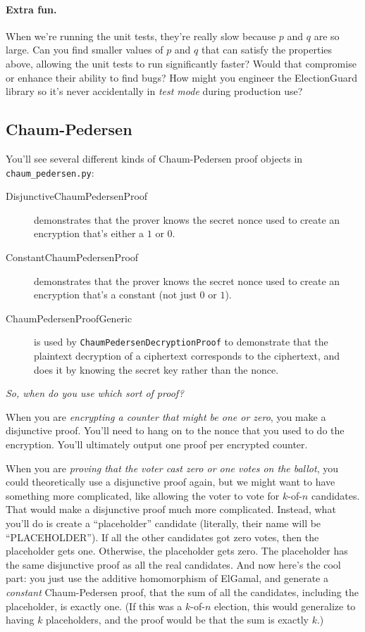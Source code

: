 \documentclass[letterpaper,12pt]{article}
\begin{document}
\paragraph{Extra fun.} When we're running the unit tests, they're
really slow because $p$ and $q$ are so large. Can you find smaller
values of $p$ and $q$ that can satisfy the properties above, allowing
the unit tests to run significantly faster? Would that compromise or
enhance their ability to find bugs? How might you engineer the
ElectionGuard library so it's never accidentally in {\em test mode}
during production use?

\subsection{Chaum-Pedersen}
\label{sec:chaum-pedersen}
You'll see several different kinds of Chaum-Pedersen proof objects
in {\tt chaum\_pedersen.py}:
\begin{description}
\item[DisjunctiveChaumPedersenProof] demonstrates that the prover knows
  the secret nonce used to create an encryption that's either a $1$ or $0$.
\item[ConstantChaumPedersenProof] demonstrates that the prover
  knows the secret nonce used to create an encryption that's a
  constant (not just $0$ or $1$).
\item[ChaumPedersenProofGeneric]
  is used by {\tt ChaumPedersenDecryptionProof} to demonstrate
  that the plaintext decryption of a ciphertext corresponds to the 
  ciphertext, and does it by knowing the secret key rather than the
  nonce.
\end{description}

{\em So, when do you use which sort of proof?}

When you are {\em encrypting a counter that might be one or zero}, you
make a disjunctive proof. You'll need to hang on to the nonce that you
used to do the encryption. You'll ultimately output one proof per encrypted
counter.

When you are {\em proving that the voter cast zero or one votes on the ballot},
you could theoretically use a disjunctive proof again, but we might
want to have something more complicated, like allowing the voter to
vote for $k$-of-$n$ candidates. That would make a disjunctive proof
much more complicated. Instead, what you'll do is create a
``placeholder'' candidate (literally, their name will be
``PLACEHOLDER''). If all the other candidates got zero votes, then the
placeholder gets one. Otherwise, the placeholder gets zero. The
placeholder has the same disjunctive proof as all the real candidates.
And now here's the cool part: you just use the additive homomorphism
of ElGamal, and generate a {\em constant} Chaum-Pedersen proof, that
the sum of all the candidates, including the placeholder, is exactly
one. (If this was a $k$-of-$n$ election, this would generalize to
having $k$ placeholders, and the proof would be that the sum is
exactly $k$.)
\end{document}
